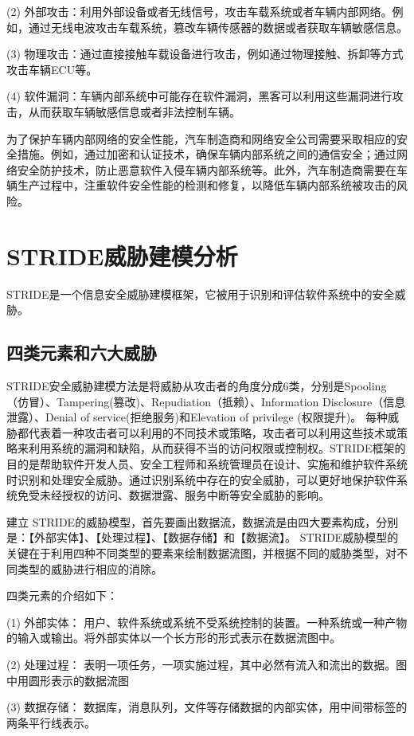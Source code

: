 (2) 外部攻击：利用外部设备或者无线信号，攻击车载系统或者车辆内部网络。例如，通过无线电波攻击车载系统，篡改车辆传感器的数据或者获取车辆敏感信息。

(3) 物理攻击：通过直接接触车载设备进行攻击，例如通过物理接触、拆卸等方式攻击车辆ECU等。

(4) 软件漏洞：车辆内部系统中可能存在软件漏洞，黑客可以利用这些漏洞进行攻击，从而获取车辆敏感信息或者非法控制车辆。

为了保护车辆内部网络的安全性能，汽车制造商和网络安全公司需要采取相应的安全措施。例如，通过加密和认证技术，确保车辆内部系统之间的通信安全；通过网络安全防护技术，防止恶意软件入侵车辆内部系统等。此外，汽车制造商需要在车辆生产过程中，注重软件安全性能的检测和修复，以降低车辆内部系统被攻击的风险。


\section{STRIDE威胁建模分析}
STRIDE是一个信息安全威胁建模框架，它被用于识别和评估软件系统中的安全威胁。  
\subsection{四类元素和六大威胁}

STRIDE安全威胁建模方法是将威胁从攻击者的角度分成6类，分别是Spooling（仿冒）、Tampering(篡改)、Repudiation（抵赖）、Information Disclosure（信息泄露）、Denial of service(拒绝服务)和Elevation of privilege (权限提升)。
每种威胁都代表着一种攻击者可以利用的不同技术或策略，攻击者可以利用这些技术或策略来利用系统的漏洞和缺陷，从而获得不当的访问权限或控制权。STRIDE框架的目的是帮助软件开发人员、安全工程师和系统管理员在设计、实施和维护软件系统时识别和处理安全威胁。通过识别系统中存在的安全威胁，可以更好地保护软件系统免受未经授权的访问、数据泄露、服务中断等安全威胁的影响。

建立 STRIDE的威胁模型，首先要画出数据流，数据流是由四大要素构成，分别是：【外部实体】、【处理过程】、【数据存储】和【数据流】。
STRIDE威胁模型的关键在于利用四种不同类型的要素来绘制数据流图，并根据不同的威胁类型，对不同类型的威胁进行相应的消除。


四类元素的介绍如下：

(1) 外部实体：
用户、软件系统或系统不受系统控制的装置。一种系统或一种产物的输入或输出。将外部实体以一个长方形的形式表示在数据流图中。

(2) 处理过程：
表明一项任务，一项实施过程，其中必然有流入和流出的数据。图中用圆形表示的数据流图

(3) 数据存储：
数据库，消息队列，文件等存储数据的内部实体，用中间带标签的两条平行线表示。

